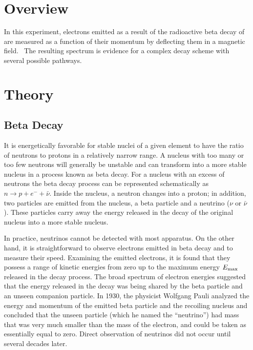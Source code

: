 \section{Overview}
In this experiment, electrons emitted as a result of the radioactive
beta decay of \cs are measured as a function of their momentum by
deflecting them in a magnetic field. \ The resulting spectrum is
evidence for a complex decay scheme with several possible pathways.

\section{Theory}
\subsection{Beta Decay}

It is energetically favorable for stable nuclei of a given element to have the
ratio of neutrons to protons in a relatively narrow range.  A nucleus with too
many or too few neutrons will generally be unstable and can transform into a
more stable nucleus in a process known as beta decay.  For a nucleus with an
excess of neutrons the beta decay process can be represented schematically as $n
\to p + e^- + \bar{\nu}$.  Inside the nucleus, a neutron changes into a proton;
in addition, two particles are emitted from the nucleus, a beta
particle  and a neutrino ($\nu$ or $\bar{\nu}$).  These particles
carry away the energy released in the decay of the original nucleus into a more
stable nucleus.

In practice, neutrinos cannot be detected with most apparatus.  On the other
hand, it is straightforward to observe electrons emitted in beta decay and to
measure their speed. Examining the emitted electrons, it is found that they
possess a range of kinetic energies from zero up to the maximum energy $E_{\rm
  max}$ released in the decay process.  The broad spectrum of electron energies
suggested that the energy released in the decay was being shared by the beta
particle and an unseen companion particle.  In 1930, the physicist Wolfgang
Pauli analyzed the energy and momentum of the emitted beta particle and the
recoiling nucleus and concluded that the unseen particle (which he named the
``neutrino'') had mass that was very much smaller than the mass of the electron,
and could be taken as essentially equal to zero.  Direct observation of
neutrinos did not occur until several decades later.


